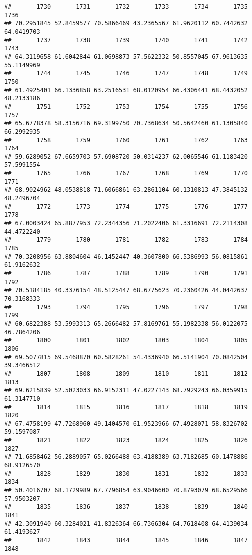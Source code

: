 \documentclass[
]{article}
\begin{document}
\begin{verbatim}
##       1730       1731       1732       1733       1734       1735       1736 
## 70.2951845 52.8459577 70.5866469 43.2365567 61.9620112 60.7442632 64.0419703 
##       1737       1738       1739       1740       1741       1742       1743 
## 64.3119658 61.6042844 61.0698873 57.5622332 50.8557045 67.9613635 55.1149969 
##       1744       1745       1746       1747       1748       1749       1750 
## 61.4925401 66.1336858 63.2516531 68.0120954 66.4306441 68.4432052 48.2133186 
##       1751       1752       1753       1754       1755       1756       1757 
## 65.6778378 58.3156716 69.3199750 70.7368634 50.5642460 61.1305840 66.2992935 
##       1758       1759       1760       1761       1762       1763       1764 
## 59.6289052 67.6659703 57.6908720 50.0314237 62.0065546 61.1183420 57.5991554 
##       1765       1766       1767       1768       1769       1770       1771 
## 68.9024962 48.0538818 71.6066861 63.2861104 60.1310813 47.3845132 48.2496704 
##       1772       1773       1774       1775       1776       1777       1778 
## 67.0003424 65.8877953 72.2344356 71.2022406 61.3316691 72.2114308 44.4722240 
##       1779       1780       1781       1782       1783       1784       1785 
## 70.3208956 63.8804604 46.1452447 40.3607800 66.5386993 56.0815861 61.9162632 
##       1786       1787       1788       1789       1790       1791       1792 
## 70.5184185 40.3376154 48.5125447 68.6775623 70.2360426 44.0442637 70.3168333 
##       1793       1794       1795       1796       1797       1798       1799 
## 60.6822388 53.5993313 65.2666482 57.8169761 55.1982338 56.0122075 46.7864206 
##       1800       1801       1802       1803       1804       1805       1806 
## 69.5077815 69.5468870 60.5828261 54.4336940 66.5141904 70.0842504 39.3466512 
##       1807       1808       1809       1810       1811       1812       1813 
## 69.6215839 52.5023033 66.9152311 47.0227143 68.7929243 66.0359915 61.3147710 
##       1814       1815       1816       1817       1818       1819       1820 
## 67.4758199 47.7268960 49.1404570 61.9523966 67.4928071 58.8326702 59.1597087 
##       1821       1822       1823       1824       1825       1826       1827 
## 71.6858462 56.2889057 65.0266488 63.4188389 63.7182685 60.1478886 68.9126570 
##       1828       1829       1830       1831       1832       1833       1834 
## 50.4016707 68.1729989 67.7796854 63.9046600 70.8793079 68.6529566 57.9503207 
##       1835       1836       1837       1838       1839       1840       1841 
## 42.3091940 60.3284021 41.8326364 66.7366304 64.7618408 64.4139034 61.4193627 
##       1842       1843       1844       1845       1846       1847       1848 

\end{verbatim}
\end{document}
